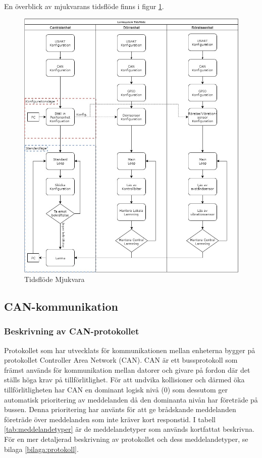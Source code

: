 \documentclass{article}
\begin{document}
En överblick av mjukvarans tidsflöde finns i figur \ref{fig:tidsflöde}.

\begin{figure}[H]
    \centering
    \includegraphics[width=1\textwidth]{figurer/TidsFlode.jpg}
    \caption{Tidsflöde Mjukvara}
    \label{fig:tidsflöde}
\end{figure}

\subsection{CAN-kommunikation}
\label{can}
\subsubsection{Beskrivning av CAN-protokollet}
Protokollet som har utvecklats för kommunikationen mellan enheterna bygger på protokollet Controller Area Network (CAN).
CAN är ett bussprotokoll som främst används för kommunikation mellan datorer och givare på fordon där det ställs höga krav på tillförlitlighet.
För att undvika kollisioner och därmed öka tillförlitligheten har CAN en dominant logisk nivå (0) som dessutom ger automatisk prioritering av meddelanden då den dominanta nivån har företräde på bussen.
Denna prioritering har använts för att ge brådskande meddelanden företräde över meddelanden som inte kräver kort responstid. I tabell \ref{tab:meddelandetyper} är de meddelandetyper som används kortfattat beskrivna. För en mer detaljerad beskrivning av protokollet och dess meddelandetyper, se bilaga \ref{bilaga:protokoll}.
\end{document}

